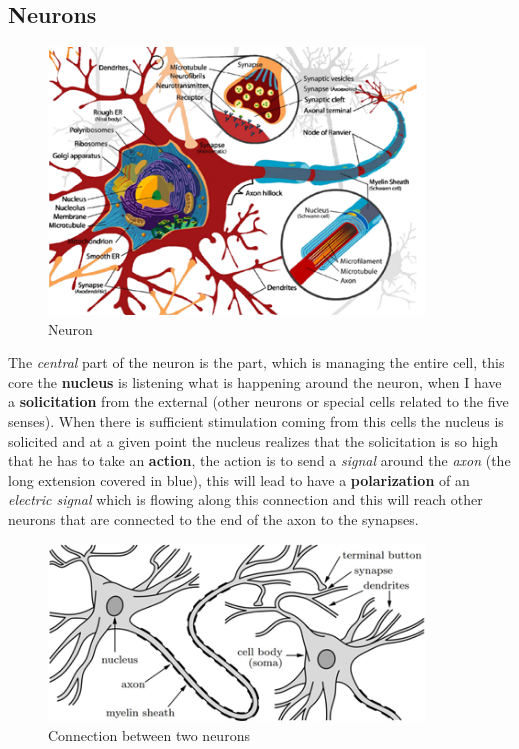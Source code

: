 \documentclass{article}
\begin{document}
\subsection{Neurons}
\begin{figure}[H]
    \centering
    \includegraphics[width=10cm]{images/neuron1.png}
    \caption{Neuron}
    \label{fig:neurone_1}
\end{figure}
The \textit{central} part of the neuron is the part, which is managing the entire cell, this core the
\textbf{nucleus} is listening what is happening around the neuron,
when I have a \textbf{solicitation} from the external (other neurons or special cells related to the five senses).
\newline\newline
When there is sufficient stimulation coming from this cells the nucleus is solicited and at a given
point the nucleus realizes that the solicitation is so high that he has to
take an \textbf{action}, the action is to send a \textit{signal} around the \textit{axon} (the long extension covered in blue),
this will lead to have a \textbf{polarization} of an \textit{electric signal} which is flowing along this connection
and this will reach other neurons that are connected to the end of the axon to the synapses.
\begin{figure}[H]
    \centering
    \includegraphics[width=10cm]{images/neuron2.png}
    \caption{Connection between two neurons}
    \label{fig:neurone_2}
\end{figure}
\end{document}
